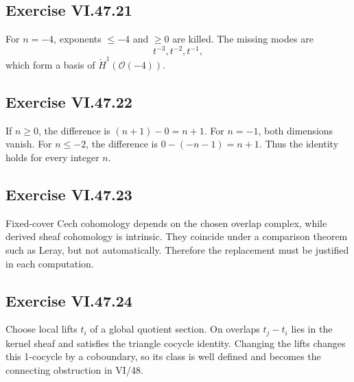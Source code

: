 \subsection*{Exercise VI.47.21}
\begin{solution}
For \(n=-4\), exponents \(\le-4\) and \(\ge0\) are killed.  The missing modes are
\[
t^{-3},t^{-2},t^{-1},
\]
which form a basis of \(\check H^1(\mathcal O(-4))\).
\end{solution}

\subsection*{Exercise VI.47.22}
\begin{solution}
If \(n\ge0\), the difference is \((n+1)-0=n+1\).  For \(n=-1\), both dimensions vanish.  For \(n\le-2\), the difference is \(0-(-n-1)=n+1\).  Thus the identity holds for every integer \(n\).
\end{solution}

\subsection*{Exercise VI.47.23}
\begin{solution}
Fixed-cover Cech cohomology depends on the chosen overlap complex, while derived sheaf cohomology is intrinsic.  They coincide under a comparison theorem such as Leray, but not automatically.  Therefore the replacement must be justified in each computation.
\end{solution}

\subsection*{Exercise VI.47.24}
\begin{solution}
Choose local lifts \(t_i\) of a global quotient section.  On overlaps \(t_j-t_i\) lies in the kernel sheaf and satisfies the triangle cocycle identity.  Changing the lifts changes this 1-cocycle by a coboundary, so its class is well defined and becomes the connecting obstruction in VI/48.
\end{solution}

